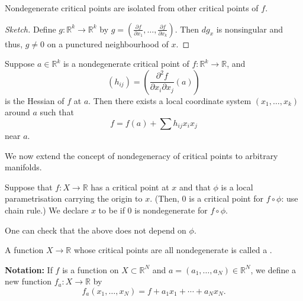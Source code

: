 \begin{prop}
	Nondegenerate critical points are isolated from other critical points of $f$.
\end{prop}
\begin{proof}[Sketch]
	Define $g : \mathbb{R}^{k} \to \mathbb{R}^{k}$ by $g = \left(\frac{\partial f}{\partial x_{1}}, \ldots, \frac{\partial f}{\partial x_{k}}\right)$. \newline
	Then $dg_{x}$ is nonsingular and thus, $g \neq 0$ on a punctured neighbourhood of $x$.
\end{proof}

\begin{thm}
	Suppose $a \in \mathbb{R}^{k}$ is a nondegenerate critical point of $f : \mathbb{R}^{k} \to \mathbb{R}$, and
	\begin{equation*} 
		(h_{ij}) = \left(\frac{\partial^{2} f}{\partial x_{i} \partial x_{j}}(a)\right)
	\end{equation*}
	is the Hessian of $f$ at $a$. Then there exists a local coordinate system $(x_{1}, \ldots, x_{k})$ around $a$ such that
	\begin{equation*} 
		f = f(a) + \sum h_{ij} x_{i} x_{j}
	\end{equation*}
	near $a$.
\end{thm}

We now extend the concept of nondegeneracy of critical points to arbitrary manifolds.

\begin{defn}
	Suppose that $f : X \to \mathbb{R}$ has a critical point at $x$ and that $\phi$ is a local parametrisation carrying the origin to $x$. (Then, $0$ is a critical point for $f \circ \phi$: use chain rule.) \newline
	We declare $x$ to be  if $0$ is nondegenerate for $f \circ \phi$.
\end{defn}

One can check that the above does not depend on $\phi$.

\begin{defn}
	A function $X \to \mathbb{R}$ whose critical points are all nondegenerate is called a .
\end{defn}

\textbf{Notation:} If $f$ is a function on $X \subset \mathbb{R}^{N}$ and $a = (a_{1}, \ldots, a_{N}) \in \mathbb{R}^{N}$, we define a new function $f_{a} : X \to \mathbb{R}$ by
\begin{equation*} 
	f_{a}(x_{1}, \ldots, x_{N}) = f + a_{1} x_{1} + \cdots + a_{N} x_{N}.
\end{equation*}

